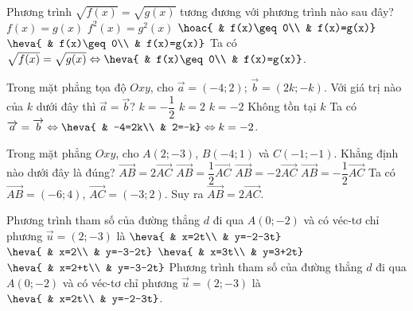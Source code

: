 \begin{ex}%
Phương trình $\sqrt{f(x)}=\sqrt{g(x)}$ tương đương với phương trình nào sau đây?
\choice
{$f(x)=g(x)$}
{$f^2(x)=g^2(x)$}
{$\hoac{ & f(x)\geq0\\ & f(x)=g(x)}$}
{\True$\heva{ & f(x)\geq0\\ & f(x)=g(x)}$}
\loigiai
{
Ta có $\sqrt{f(x)}=\sqrt{g(x)}\Leftrightarrow \heva{ & f(x)\geq0\\ & f(x)=g(x)}$.
}
\end{ex}

\begin{ex}%
Trong mặt phẳng tọa độ $Oxy$, cho $\overrightarrow{a}=(-4;2)$; $\overrightarrow{b}=(2k;-k)$. Với giá trị nào của $k$ dưới đây thì $\overrightarrow{a}=\overrightarrow{b}$?
\choice
{$k=-\dfrac{1}{2}$}
{$k=2$}
{\True $k=-2$}
{Không tồn tại $k$}
\loigiai
{
Ta có $\overrightarrow{a}=\overrightarrow{b}\Leftrightarrow \heva{ & -4=2k\\ & 2=-k}\Leftrightarrow k=-2$.
}
\end{ex}

\begin{ex}%
Trong mặt phẳng $Oxy$, cho $A(2;-3)$, $B(-4;1)$ và $C(-1;-1)$. Khẳng định nào dưới đây là đúng?
\choice
{\True $\overrightarrow{AB}=2\overrightarrow{AC}$}
{$\overrightarrow{AB}=\dfrac{1}{2}\overrightarrow{AC}$}
{$\overrightarrow{AB}=-2\overrightarrow{AC}$}
{$\overrightarrow{AB}=-\dfrac{1}{2}\overrightarrow{AC}$}
\loigiai
{
Ta có $\overrightarrow{AB}=(-6;4)$, $\overrightarrow{AC}=(-3;2)$. Suy ra $\overrightarrow{AB}=2\overrightarrow{AC}$.
}
\end{ex}

\begin{ex}%
Phương trình tham số của đường thẳng $d$ đi qua $A(0;-2)$ và có véc-tơ chỉ phương $\overrightarrow{u}=(2;-3)$ là
\choice
{\True$\heva{ & x=2t\\ & y=-2-3t}$}
{$\heva{ & x=2\\ & y=-3-2t}$}
{$\heva{ & x=3t\\ & y=3+2t}$}
{$\heva{ & x=2+t\\ & y=-3-2t}$}
\loigiai
{
Phương trình tham số của đường thẳng $d$ đi qua $A(0;-2)$ và có véc-tơ chỉ phương $\overrightarrow{u}=(2;-3)$ là $\heva{ & x=2t\\ & y=-2-3t}$.
}
\end{ex}

